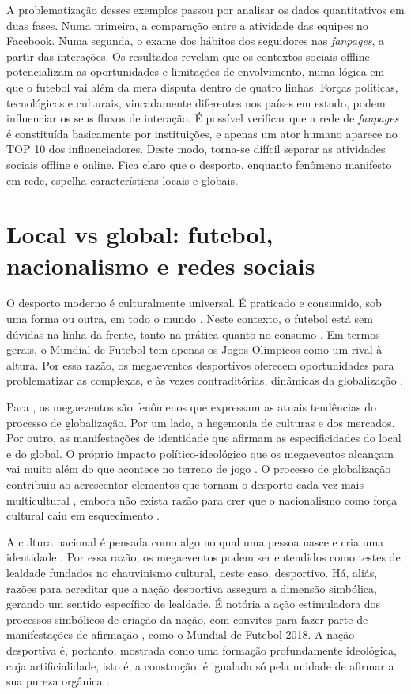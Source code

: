 \documentclass{textolivre}
\begin{document}
A problematização desses exemplos passou por analisar os dados quantitativos em duas fases. Numa primeira, a comparação entre a atividade das equipes no Facebook. Numa segunda, o exame dos hábitos dos seguidores nas \emph{fanpages}, a partir das interações. Os resultados revelam que os contextos sociais offline potencializam as oportunidades e limitações de envolvimento, numa lógica em que o futebol vai além da mera disputa dentro de quatro linhas. Forças políticas, tecnológicas e culturais, vincadamente diferentes nos países em estudo, podem influenciar os seus fluxos de interação. É possível verificar que a rede de \emph{fanpages} é constituída basicamente por instituições, e apenas um ator humano aparece no TOP 10 dos influenciadores. Deste modo, torna-se difícil separar as atividades sociais offline e online. Fica claro que o desporto, enquanto fenômeno manifesto em rede, espelha características locais e globais.

\section{Local vs global: futebol, nacionalismo e redes sociais}\label{sec-localglobal}
O desporto moderno é culturalmente universal. É praticado e consumido, sob uma forma ou outra, em todo o mundo \cite{wagg2006}. Neste contexto, o futebol está sem dúvidas na linha da frente, tanto na prática quanto no consumo \cite{giulianotti2015}. Em termos gerais, o Mundial de Futebol tem apenas os Jogos Olímpicos como um rival à altura. Por essa razão, os megaeventos desportivos oferecem oportunidades para problematizar as complexas, e às vezes contraditórias, dinâmicas da globalização \cite{gruneau2017, giddens1999}.

Para \textcite{roche2000}, os megaeventos são fenômenos que expressam as atuais tendências do processo de globalização. Por um lado, a hegemonia de culturas e dos mercados. Por outro, as manifestações de identidade que afirmam as especificidades do local e do global. O próprio impacto político-ideológico que os megaeventos alcançam vai muito além do que acontece no terreno de jogo \cite{rowe2003}. O processo de globalização contribuiu ao acrescentar elementos que tornam o desporto cada vez mais multicultural \cite{jenkins2012}, embora não exista razão para crer que o nacionalismo como força cultural caiu em esquecimento \cite{rowe1998}.

A cultura nacional é pensada como algo no qual uma pessoa nasce e cria uma identidade \cite{maguire1993}. Por essa razão, os megaeventos podem ser entendidos como testes de lealdade fundados no chauvinismo cultural, neste caso, desportivo. Há, aliás, razões para acreditar que a nação desportiva assegura a dimensão simbólica, gerando um sentido específico de lealdade. É notória a ação estimuladora dos processos simbólicos de criação da nação, com convites para fazer parte de manifestações de afirmação \cite{frederick2016, marivoet2006}, como o Mundial de Futebol 2018. A nação desportiva é, portanto, mostrada como uma formação profundamente ideológica, cuja artificialidade, isto é, a construção, é igualada só pela unidade de afirmar a sua pureza orgânica \cite{hobsbawm2012}.
\end{document}

